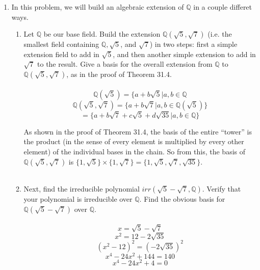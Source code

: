 \begin{enumerate}
  \item In this problem, we will build an algebraic extension of $\mathds{Q}$ in a couple differet ways.
    \begin{enumerate}
      \item Let $\mathds{Q}$ be our base field. Build the extension $\mathds{Q}(\sqrt{5}, \sqrt{7})$ (i.e. the smallest field containing $\mathds{Q}, \sqrt{5}$, and $\sqrt{7}$) in two steps: first a simple extension field to add in $\sqrt{5}$, and then another simple extension to add in $\sqrt{7}$ to the result. Give a basis for the overall extension from $\mathds{Q}$ to $\mathds{Q}(\sqrt{5}, \sqrt{7})$, as in the proof of Theorem 31.4.\\\\

        $$\mathds{Q}(\sqrt{5}) = \{a + b\sqrt{5} | a,b \in \mathds{Q}$$
        $$\mathds{Q}(\sqrt{5},\sqrt{7}) = \{a + b\sqrt{7} | a,b \in \mathds{Q}(\sqrt{5})\}$$
        $$= \{a + b\sqrt{7} + c\sqrt{5} + d\sqrt{35} | a,b \in \mathds{Q} \}$$

        As shown in the proof of Theorem 31.4, the basis of the entire ``tower'' is the product (in the sense of every element is multiplied by every other element) of the individual bases in the chain. So from this, the basis of $\mathds{Q}(\sqrt{5}, \sqrt{7})$ is $\{1, \sqrt{5}\} \times \{1, \sqrt{7}\} = \{1, \sqrt{5}, \sqrt{7}, \sqrt{35}\}$.\\\\


      \item Next, find the irreducible polynomial $irr(\sqrt{5} - \sqrt{7}, \mathds{Q})$. Verify that your polynomial is irreducible over $\mathds{Q}$. Find the obvious basis for $\mathds{Q}(\sqrt{5} - \sqrt{7})$ over $\mathds{Q}$.\\\\
        
        $$x = \sqrt{5} - \sqrt{7}$$
        $$x^2 = 12 - 2\sqrt{35}$$
        $$(x^2-12)^2 = (-2\sqrt{35})^2$$
        $$x^4-24x^2+144 = 140$$
        $$x^4-24x^2+4 = 0$$
        

\end{enumerate}
\end{enumerate}

